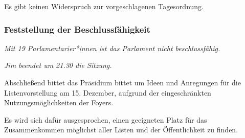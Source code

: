 \documentclass[ngerman,headheight=70pt]{scrartcl}
\begin{document}
    Es gibt keinen Widerspruch zur vorgeschlagenen Tagesordnung.

    \subsubsection{Feststellung der Beschlussfähigkeit}

    \textit{Mit 19 Parlamentarier*innen ist das Parlament nicht beschlussfähig.}

    \textit{Jim beendet um 21.30 die Sitzung.}

    Abschließend bittet das Präsidium bittet um Ideen und Anregungen für die
    Listenvorstellung am 15. Dezember, aufgrund der eingeschränkten
    Nutzungsmöglichkeiten der Foyers.

    Es wird sich dafür ausgesprochen, einen geeigneten Platz für das
    Zusammenkommen möglichst aller Listen und der Öffentlichkeit zu finden.
\end{document}
